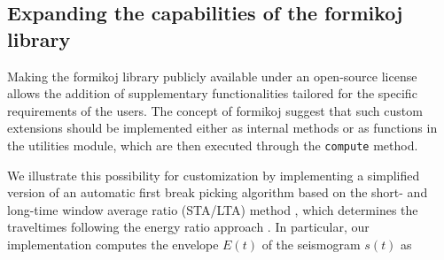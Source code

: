 \documentclass[a4paper,fleqn]{cas-sc}
\begin{document}

\subsection{Expanding the capabilities of the formikoj library}
Making the formikoj library publicly available under an open-source license 
allows the addition of supplementary functionalities tailored for the specific requirements of the users.
The concept of formikoj suggest that such custom extensions should be implemented either as internal methods or as functions in the utilities module, which are then executed through the \texttt{compute} method.%

We illustrate this possibility for customization by implementing 
a simplified version of an automatic first break picking algorithm based on the short- and long-time window average ratio (STA/LTA) method \citep{allen1978}, which determines the traveltimes following the energy ratio approach \citep[e.g.,][]{earle1994}. In particular, our implementation computes the envelope $E\left(t\right)$ of the seismogram $s\left(t\right)$ as \citep[e.g.,][]{duan2020}
\end{document}
